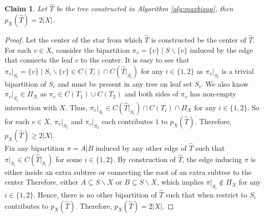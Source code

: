 \documentclass{article}
\newtheorem{claim}{Claim}
\begin{document}
\begin{claim} \label{claim:begin}
    Let $\hat{T}$ be the tree constructed in Algorithm \ref{alg:maxbisup}, then $p_X(\hat{T}) = 2 |X|$. 
\end{claim}
\begin{proof}
    Let the center of the star from which $\hat{T}$ is constructed be the center of $\hat{T}$. For each $v \in X$, consider the bipartition $\pi_v = \{v\}\mid S \backslash \{v\}$ induced by the edge that connects the leaf $v$ to the center. It is easy to see that $\pi_v|_{S_i} = \{v\} \mid S_i \backslash \{v\} \in C(T_i)\cap C(\hat{T}|_{S_i})$ for any $i\in\{1,2\}$ as $\pi_v|_{S_i}$ is a trivial bipartition of $S_i$ and must be present in any tree on leaf set $S_i$. We also know $\pi_v|_{S_i} \in \Pi_X$ as $\pi_v \in C(T_1)\cup C(T_2)$ and both sides of $\pi_v$ has non-empty intersection with $X$. Thus, $\pi_v|_{S_i} \in C(\hat{T}|_{S_i}) \cap C(T_i) \cap \Pi_X$ for any $i \in \{1,2\}$. So for each $v \in X$, $\pi_v|_{S_1}$ and $\pi_v|_{S_2}$ each contributes $1$ to $p_X(\hat{T})$. Therefore, $p_X(\hat{T}) \ge 2|X|$. \\
    
    Fix any bipartition $\pi = A|B$ induced by any other edge of $\hat{T}$ such that $\pi|_{S_i} \in C(\hat{T}|_{S_i})$ for some $i \in \{1,2\}$. By construction of $\hat{T}$, the edge inducing $\pi$ is either inside an extra subtree or connecting the root of an extra subtree to the center Therefore, either $A \subseteq S\backslash X $ or $B \subseteq S \backslash X$, which implies $\pi|_{S_i} \notin \Pi_X$ for any $i \in \{1,2\}$. Hence, there is no other bipartition of $\hat{T}$ such that when restrict to $S_i$ contributes to $p_X(\hat{T})$. Therefore, $p_X(\hat{T}) = 2|X|$.
\end{proof}
\end{document}
